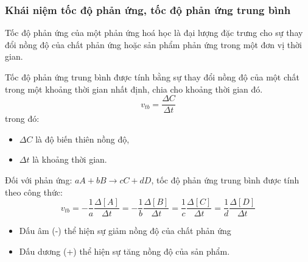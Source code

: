 \documentclass[Main.tex]{subfiles}
\begin{document}
	\subsubsection{Khái niệm tốc độ phản ứng, tốc độ phản ứng trung bình}
	\begin{ghinho}
	Tốc độ phản ứng của một phản ứng hoá học là đại lượng đặc trưng cho sự thay đổi nồng độ của chất phản ứng hoặc sản phẩm phản ứng trong một đơn vị thời gian.
	\end{ghinho}
	\begin{ghinho}
		Tốc độ phản ứng trung bình được tính bằng sự thay đổi nồng độ của một chất trong một khoảng thời gian nhất định, chia cho khoảng thời gian đó.
		\[v_{tb} = \frac{\Delta C}{\Delta t}\]
		trong đó: 
		\begin{itemize}
			\item $\Delta C$ là độ biến thiên nồng độ,
			\item $\Delta t$ là khoảng thời gian.
		\end{itemize}
		Đối với phản ứng: $aA + bB \rightarrow cC + dD$, tốc độ phản ứng trung bình được tính theo công thức:
		\[v_{tb} = -\frac{1}{a}\frac{\Delta [A]}{\Delta t} = -\frac{1}{b}\frac{\Delta [B]}{\Delta t} = \frac{1}{c}\frac{\Delta [C]}{\Delta t} = \frac{1}{d}\frac{\Delta [D]}{\Delta t}\]
		\begin{itemize}
			\item Dấu âm (-) thể hiện sự giảm nồng độ của chất phản ứng
			\item Dấu dương (+) thể hiện sự tăng nồng độ của sản phẩm.
		\end{itemize}
	\end{ghinho}
\end{document}
